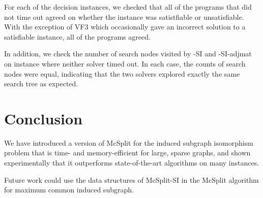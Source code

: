For each of the decision instances, we checked that all of the programs that did not time out
agreed on whether the instance was satistfiable or unsatisfiable.  With the exception of VF3
which occasionally gave an incorrect solution to a satisfiable instance, all of the programs
agreed.

In addition, we check the number of search nodes visited by \McSplit-SI and \McSplit-SI-adjmat
on instance where neither solver timed out.  In each case, the counts of search nodes were equal,
indicating that the two solvers explored exactly the same search tree as expected.

\section{Conclusion}

We have introduced a version of McSplit for the induced subgraph isomorphism problem that is time- and memory-efficient for large, sparse graphs, and shown experimentally that it outperforms state-of-the-art algorithms on many instances.

Future work could use the data structures of McSplit-SI in the McSplit algorithm for maximum common induced subgraph.
